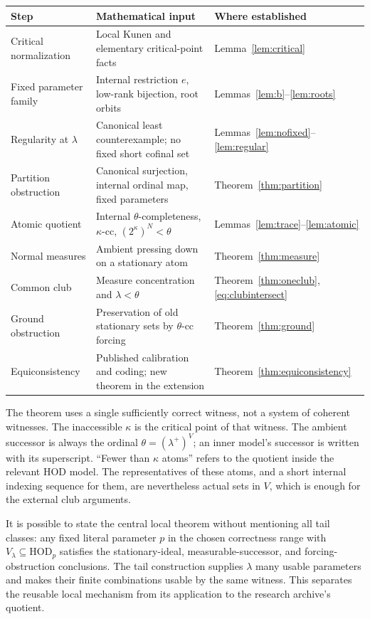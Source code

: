 \documentclass[11pt,letterpaper]{article}
\theoremstyle{definition}
\numberwithin{equation}{section}
\newcommand{\HOD}{\mathrm{HOD}}
\begin{document}
\begin{center}
\small
\renewcommand{\arraystretch}{1.2}
\begin{tabularx}{\textwidth}{@{}P{.27\textwidth}YP{.23\textwidth}@{}}
\toprule
\textbf{Step}&\textbf{Mathematical input}&\textbf{Where established}\\
\midrule
Critical normalization&Local Kunen and elementary critical-point facts&Lemma~\ref{lem:critical}\\
Fixed parameter family&Internal restriction $e$, low-rank bijection, root orbits&Lemmas~\ref{lem:b}--\ref{lem:roots}\\
Regularity at $\lambda$&Canonical least counterexample; no fixed short cofinal set&Lemmas~\ref{lem:nofixed}--\ref{lem:regular}\\
Partition obstruction&Canonical surjection, internal ordinal map, fixed parameters&Theorem~\ref{thm:partition}\\
Atomic quotient&Internal $\theta$-completeness, $\kappa$-cc, $(2^\kappa)^N<\theta$&Lemmas~\ref{lem:trace}--\ref{lem:atomic}\\
Normal measures&Ambient pressing down on a stationary atom&Theorem~\ref{thm:measure}\\
Common club&Measure concentration and $\lambda<\theta$&Theorem~\ref{thm:oneclub}, \eqref{eq:clubintersect}\\
Ground obstruction&Preservation of old stationary sets by $\theta$-cc forcing&Theorem~\ref{thm:ground}\\
Equiconsistency&Published calibration and coding; new theorem in the extension&Theorem~\ref{thm:equiconsistency}\\
\bottomrule
\end{tabularx}
\end{center}

The theorem uses a single sufficiently correct witness, not a system of coherent witnesses. The inaccessible $\kappa$ is the critical point of that witness. The ambient successor is always the ordinal $\theta=(\lambda^+)^V$; an inner model's successor is written with its superscript. ``Fewer than $\kappa$ atoms'' refers to the quotient inside the relevant $\HOD$ model. The representatives of these atoms, and a short internal indexing sequence for them, are nevertheless actual sets in $V$, which is enough for the external club arguments.

It is possible to state the central local theorem without mentioning all tail classes: any fixed literal parameter $p$ in the chosen correctness range with $V_\lambda\subseteq\HOD_p$ satisfies the stationary-ideal, measurable-successor, and forcing-obstruction conclusions. The tail construction supplies $\lambda$ many usable parameters and makes their finite combinations usable by the same witness. This separates the reusable local mechanism from its application to the research archive's quotient.
\end{document}
